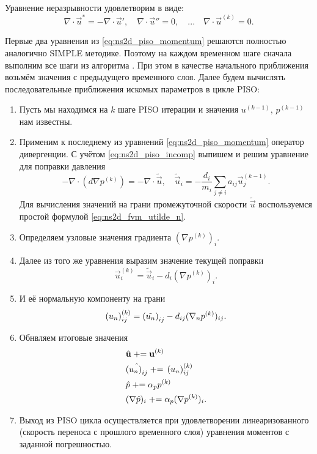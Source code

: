 Уравнение неразрывности удовлетворим в виде:
\begin{equation}
\label{eq:ns2d_piso_incomp}
\nabla \cdot \vec u^* = -\nabla \cdot \vec u', \quad \nabla \cdot \vec u'' = 0, \quad ... \quad \nabla \cdot \vec u^{(k)} = 0.
\end{equation}


Первые два уравнения из \cref{eq:ns2d_piso_momentum} решаются полностью аналогично SIMPLE методике.
Поэтому на каждом временном шаге сначала выполним 
все шаги из алгоритма \label{ref:fvm_simple_steps}.
При этом в качестве начального приближения возьмём значения с предыдущего временного слоя.
Далее будем вычислять последовательные приближения искомых параметров в цикле PISO:
\begin{enumerate}
\item Пусть мы находимся на $k$ шаге PISO итерации и значения $u^{(k-1)}$, $p^{(k-1)}$ нам известны.
\item Применим к последнему из уравнений \cref{eq:ns2d_piso_momentum} оператор дивергенции.
      С учётом \cref{eq:ns2d_piso_incomp} выпишем и решим уравнение для поправки давления
\begin{equation*}
- \nabla \cdot \left(d \nabla p^{(k)} \right) = -\nabla\cdot \tilde{\vec u}, \quad \tilde{\vec u}_i = -\frac{d_i}{m_i}\sum_{j\neq i} a_{ij} \vec u^{(k-1)}_j.
\end{equation*}
Для вычисления значений на грани промежуточной скорости $\tilde{\vec u}$ воспользуемся простой формулой \cref{eq:ns2d_fvm_utilde_n}.
\item Определяем узловые значения градиента $(\nabla p^{(k)})_i$.
\item Далее из того же уравнения выразим значение текущей поправки
\begin{equation*}
\vec u^{(k)}_i = \tilde{\vec u}_i - d_i (\nabla p^{(k)})_i.
\end{equation*}
\item И её нормальную компоненту на грани
\begin{equation*}
\left(u_n\right)_{ij}^{(k)} = \left(\tilde{u_n}\right)_{ij} - d_{ij} (\nabla_n p^{(k)})_{ij}.
\end{equation*}
\item Обнвляем итоговые значения
\begin{align*}
&\hat{\boldsymbol{\rm u}} \;{{+}{=}}\; \boldsymbol{\rm u}^{(k)} \\
&\hat{\left(u_n\right)_{ij}} \;{{+}{=}}\; \left(u_n\right)_{ij}^{(k)}\\
&\hat p \;{{+}{=}}\; \alpha_p p^{(k)} \\
&(\nabla \hat p)_i \;{{+}{=}}\; \alpha_p (\nabla p^{(k)})_i.
\end{align*}
\item Выход из PISO цикла осуществляется при
удовлетворении линеаризованного (скорость переноса с прошлого временного слоя) уравнения моментов
с заданной погрешностью.
\end{enumerate}

